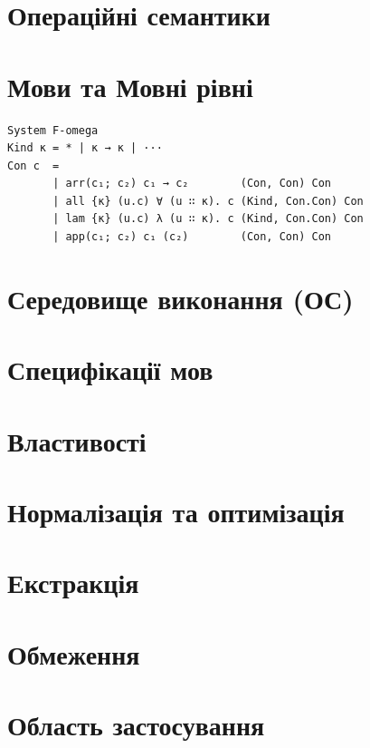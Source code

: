 \section{Операційні семантики}
\section{Мови та Мовні рівні}

\begin{lstlisting}
System F-omega
Kind κ = * | κ → κ | ···
Con c  =
       | arr(c₁; c₂) c₁ → c₂        (Con, Con) Con
       | all {κ} (u.c) ∀ (u ∷ κ). c (Kind, Con.Con) Con
       | lam {κ} (u.c) λ (u ∷ κ). c (Kind, Con.Con) Con
       | app(c₁; c₂) c₁ (c₂)        (Con, Con) Con
\end{lstlisting}

\section{Середовище виконання (ОС)}
\section{Специфікації мов}
\section{Властивості}
\section{Нормалізація та оптимізація}
\section{Екстракція}
\section{Обмеження}
\section{Область застосування}

